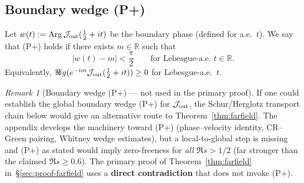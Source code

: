 \documentclass[11pt]{amsart}
\theoremstyle{definition}
\theoremstyle{remark}
\newtheorem{remark}[theorem]{Remark}
\DeclareMathOperator{\Arg}{Arg}
\begin{document}
\subsection*{Boundary wedge (P+)}
Let $w(t):=\Arg \mathcal J_{\rm out}(\tfrac12+it)$ be the boundary phase (defined for a.e.\ $t$).
We say that \textup{(P+)} holds if there exists $m\in\mathbb R$ such that
\[
  |w(t)-m|<\frac{\pi}{2}\qquad\text{for Lebesgue-a.e.\ }t\in\mathbb R.
\]
Equivalently, $\Re\!ig(e^{-im}\mathcal J_{\rm out}(\tfrac12+it))\ge 0$ for Lebesgue-a.e.\ $t$.
\begin{remark}[Boundary wedge \textup{(P+)} --- not used in the primary proof]\label{thm:Pplus}
If one could establish the global boundary wedge \textup{(P+)} for $\mathcal J_{\rm out}$,
the Schur/Herglotz transport chain below would give an alternative route
to Theorem~\ref{thm:farfield}.
The appendix develops the machinery toward \textup{(P+)}
(phase--velocity identity, CR--Green pairing, Whitney wedge estimates),
but a local-to-global step is missing and \textup{(P+)} as stated would imply
zero-freeness for \emph{all} $\Re s>1/2$ (far stronger than the claimed $\Re s\ge 0.6$).
The primary proof of Theorem~\ref{thm:farfield} in~\S\ref{sec:proof-farfield}
uses a \textbf{direct contradiction} that does not invoke \textup{(P+)}.
\end{remark}
\end{document}
